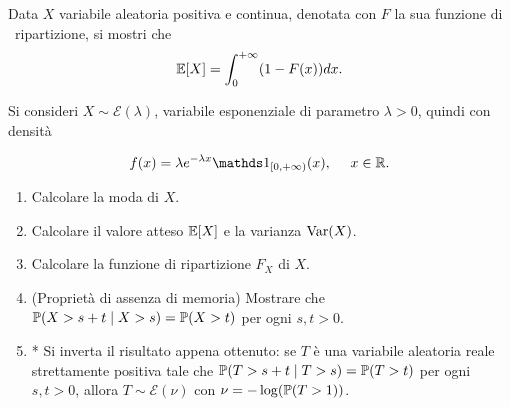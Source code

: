 Data $X$ variabile aleatoria positiva e continua, denotata con $F$ la sua funzione di \ ripartizione, si mostri che
\begin{equation*}
\mathbb{E}[X] =\int_{0}^{+\infty }(1-F(x)) dx.
\end{equation*}

Si consideri $X\sim \mathcal{E}(\lambda)$, variabile esponenziale di parametro $\lambda  >0$, quindi con densità


\begin{equation*}
f(x) =\lambda e^{-\lambda x} \Ind_{[ 0,+\infty)}(x) ,\ \ \ \ x\in \RR .
\end{equation*}
\begin{enumerate}
\item Calcolare la moda di $X$.
\item Calcolare il valore atteso $\mathbb{E}[X]$ e la varianza $\operatorname{Var}(X)$.
\item Calcolare la funzione di ripartizione $F_{X}$ di $X$.
\item (Proprietà di assenza di memoria) Mostrare che $\mathbb{P}(X >s+t \mid X >s) =\mathbb{P}(X >t)$ per ogni $s,t >0$.
\item * Si inverta il risultato appena ottenuto: se $T$ è una variabile aleatoria reale strettamente positiva tale che $\mathbb{P}(T >s+t\mid T >s) =\mathbb{P}(T >t)$ per ogni $s,t >0$, allora $T\sim \mathcal{E}(\nu)$ con $\nu =-\log(\mathbb{P}(T >1))$.
\end{enumerate}

